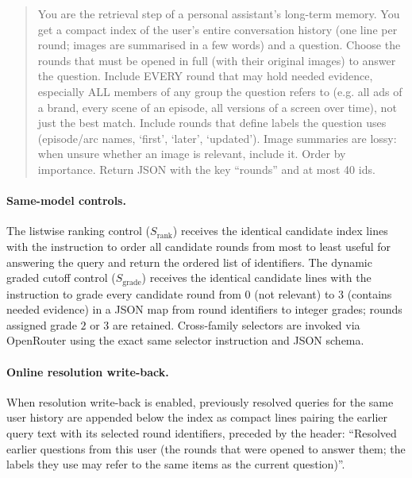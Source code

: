 \documentclass[10pt]{article}
\begin{document}
\begin{quote}\small
You are the retrieval step of a personal assistant's long-term memory. You get a compact index of the user's entire conversation history (one line per round; images are summarised in a few words) and a question. Choose the rounds that must be opened in full (with their original images) to answer the question. Include EVERY round that may hold needed evidence, especially ALL members of any group the question refers to (e.g. all ads of a brand, every scene of an episode, all versions of a screen over time), not just the best match. Include rounds that define labels the question uses (episode/arc names, `first', `later', `updated'). Image summaries are lossy: when unsure whether an image is relevant, include it. Order by importance. Return JSON with the key ``rounds'' and at most 40 ids.
\end{quote}

\paragraph{Same-model controls.} The listwise ranking control ($S_{\mathrm{rank}}$) receives the identical candidate index lines with the instruction to order all candidate rounds from most to least useful for answering the query and return the ordered list of identifiers. The dynamic graded cutoff control ($S_{\mathrm{grade}}$) receives the identical candidate lines with the instruction to grade every candidate round from $0$ (not relevant) to $3$ (contains needed evidence) in a JSON map from round identifiers to integer grades; rounds assigned grade $2$ or $3$ are retained. Cross-family selectors are invoked via OpenRouter using the exact same selector instruction and JSON schema.

\paragraph{Online resolution write-back.} When resolution write-back is enabled, previously resolved queries for the same user history are appended below the index as compact lines pairing the earlier query text with its selected round identifiers, preceded by the header: ``Resolved earlier questions from this user (the rounds that were opened to answer them; the labels they use may refer to the same items as the current question)''.
\end{document}
